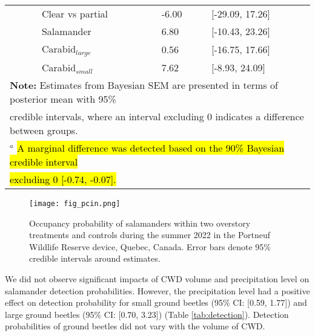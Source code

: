 \begin{table}[h!]
\begin{tabular}{lllll}
                          && Clear vs partial  & -6.00 & [-29.09, 17.26] \\  
                          && Salamander        & \hspace{1mm}6.80 & [-10.43, 23.26] \\ 
                          && Carabid$_{large}$      & \hspace{1mm}0.56 & [-16.75, 17.66] \\ 
                          && Carabid$_{small}$      & \hspace{1mm}7.62 & [-8.93, 24.09] \\ 
      \hline
      \multicolumn{5}{l}{\textbf{Note:} Estimates from Bayesian SEM are presented in terms of posterior mean with 95\%} \\
      \multicolumn{5}{l}{credible intervals, where an interval excluding 0 indicates a difference between groups.} \\
      \multicolumn{5}{l}{$^{a}$ \hl{A marginal difference was detected based on the 90\% Bayesian credible interval} } \\
      \multicolumn{5}{l}{\hl{excluding 0 [-0.74, -0.07].}}
  \end{tabular}
\end{table}

\pagebreak

\begin{figure}[h!]
  \centering
  \texttt{[image: fig\_pcin.png]}
  \caption[Occupancy probability of salamanders under overstory treatments]
  {Occupancy probability of salamanders within two overstory treatments and controls during the summer 2022 in the Portneuf Wildlife Reserve device, Quebec, Canada. 
  Error bars denote 95\% credible intervals around estimates.}
  \label{fig:pcin}
\end{figure}

\vspace{10pt}

\clearpage

We did not observe significant impacts of CWD volume and precipitation level on salamander detection probabilities. 
However, the precipitation level had a positive effect on detection probability for small ground beetles (95\% CI: [0.59, 1.77]) and large ground beetles (95\% CI: [0.70, 3.23]) (Table \ref{tab:detection}). 
Detection probabilities of ground beetles did not vary with the volume of CWD.

